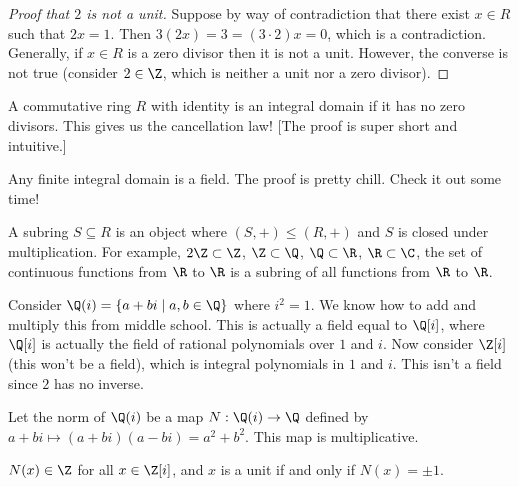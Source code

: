 \begin{proof}[Proof that $2$ is not a unit]
Suppose by way of contradiction that there exist $x \in R$ such that $2x = 1$. Then $3(2x) = 3 = (3 \cdot 2)x = 0$, which is a contradiction. Generally, if $x \in R$ is a zero divisor then it is not a unit. However, the converse is not true (consider $2 \in \Z$, which is neither a unit nor a zero divisor).
\end{proof}

\begin{definition}
A commutative ring $R$ with identity is an integral domain if it has no zero divisors. This gives us the cancellation law! [The proof is super short and intuitive.]
\end{definition}

\begin{proposition}
Any finite integral domain is a field. The proof is pretty chill. Check it out some time!
\end{proposition}

\begin{definition}[Subring]
A subring $S \subseteq R$ is an object where $(S,+) \leq (R,+)$ and $S$ is closed under multiplication. For example, $2\Z \subset \Z$, $\Z \subset \Q$, $\Q \subset \R$, $\R \subset \C$, the set of continuous functions from $\R$ to $\R$ is a subring of all functions from $\R$ to $\R$.
\end{definition}

\begin{example}
Consider $\Q(i) = \{a + bi \mid a,b \in \Q\}$ where $i^2 = 1$. We know how to add and multiply this from middle school. This is actually a field equal to $\Q[i]$, where $\Q[i]$ is actually the field of rational polynomials over $1$ and $i$. Now consider $\Z[i]$ (this won't be a field), which is integral polynomials in $1$ and $i$. This isn't a field since $2$ has no inverse.
\end{example}

\begin{definition}[Norm]
Let the norm of $\Q(i)$ be a map $N : \Q(i) \to \Q$ defined by $a + bi \mapsto (a+bi)(a-bi) = a^2+b^2$. This map is multiplicative.
\end{definition}

\begin{proposition}
$N(x) \in \Z$ for all $x \in \Z[i]$, and $x$ is a unit if and only if $N(x) = \pm 1$.
\end{proposition}